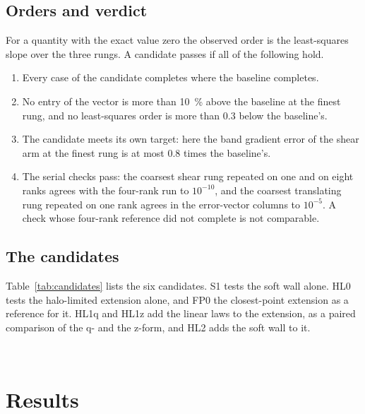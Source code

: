 \documentclass[preprint,3p,11pt]{elsarticle}
\begin{document}
\subsection{Orders and verdict}
\label{sec:gate-verdict}
For a quantity with the exact value zero the observed order is the least-squares slope
over the three rungs. A candidate passes if all of the following hold.
\begin{enumerate}
  \item Every case of the candidate completes where the baseline completes.
  \item No entry of the vector is more than \SI{10}{\percent} above the baseline at the
  finest rung, and no least-squares order is more than $0.3$ below the baseline's.
  \item The candidate meets its own target: here the band gradient error of the shear
  arm at the finest rung is at most $0.8$ times the baseline's.
  \item The serial checks pass: the coarsest shear rung repeated on one and on eight
  ranks agrees with the four-rank run to $10^{-10}$, and the coarsest translating rung
  repeated on one rank agrees in the error-vector columns to $10^{-5}$. A check whose
  four-rank reference did not complete is not comparable.
\end{enumerate}

\subsection{The candidates}
\label{sec:gate-candidates}
Table~\ref{tab:candidates} lists the six candidates. S1 tests the soft wall alone. HL0
tests the halo-limited extension alone, and FP0 the closest-point extension as a
reference for it. HL1q and HL1z add the linear laws to the extension, as a paired
comparison of the q- and the z-form, and HL2 adds the soft wall to it.

\begin{table}[t]
  \centering
  \caption{The candidates of the first campaign. Every other setting is the baseline's.}
  \label{tab:candidates}
  \small
  \resizebox{\textwidth}{!}{}\\[3pt]
  {\footnotesize }
\end{table}

\section{Results}
\label{sec:results}
\end{document}
